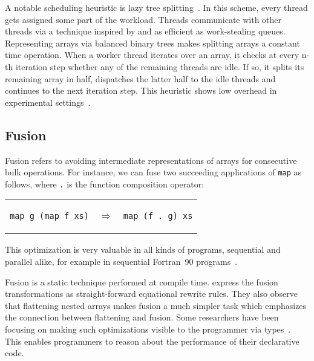 \documentclass[a4paper]{article}
\begin{document}
A notable scheduling heuristic is lazy tree splitting~\cite{Bergstrom:2010:LTS:1863543.1863558}. In this scheme, every thread gets assigned some part of the workload. Threads communicate with other threads via a technique inspired by and as efficient as work-stealing queues. Representing arrays via balanced binary trees makes splitting arrays a constant time operation. When a worker thread iterates over an array, it checks at every n-th iteration step whether any of the remaining threads are idle. If so, it splits its remaining array in half, dispatches the latter half to the idle threads and continues to the next iteration step. This heuristic shows low overhead in experimental settings~\cite{Bergstrom:2010:LTS:1863543.1863558}.

\subsection{Fusion}
\label{sec:fusion}

Fusion refers to avoiding intermediate representations of arrays for consecutive bulk operations. For instance, we can fuse two succeeding applications of \texttt{map} as follows, where \texttt{.} is the function composition operator:

\begin{center}
  \begin{tabular}{ccc}
\begin{lstlisting}[language=ML]
map g (map f xs)
\end{lstlisting}
    & $\Longrightarrow$ &
\begin{lstlisting}[language=ML]
map (f . g) xs
\end{lstlisting}
  \end{tabular}
\end{center}

This optimization is very valuable in all kinds of programs, sequential and parallel alike, for example in sequential Fortran~90 programs~\cite{Hwang:1995:AOS:209936.209949}.

Fusion is a static technique performed at compile time. \citet{Chakravarty:2001:FAF:507635.507661} express the fusion transformations as straight-forward equational rewrite rules. They also observe that flattening nested arrays makes fusion a much simpler task which emphasizes the connection between flattening and fusion. Some researchers have been focusing on making such optimizations visible to the programmer via types~\cite{Lippmeier:2012:GPA:2364506.2364511}. This enables programmers to reason about the performance of their declarative code.
\end{document}
